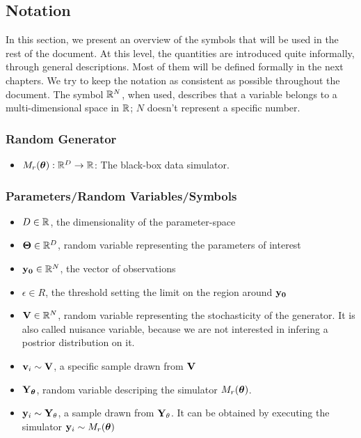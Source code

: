 \subsection{Notation}
\label{subsec:notation}

In this section, we present an overview of the symbols that will be
used in the rest of the document. At this level, the quantities are
introduced quite informally, through general descriptions. Most of
them will be defined formally in the next chapters. We try to keep the
notation as consistent as possible throughout the document. The symbol
$\mathbb{R}^N$, when used, describes that a variable belongs to a
multi-dimensional space in $\mathbb{R}$; $N$ doesn't represent a specific
number.

\subsubsection*{Random Generator}
\label{sec:random-generator}
\begin{itemize}
\item $M_r(\boldsymbol{\theta}): \mathbb{R}^D \rightarrow \mathbb{R}$: The black-box data simulator.
\end{itemize}

\subsubsection*{Parameters/Random Variables/Symbols}
\label{sec:variables}

\begin{itemize}
\item $D \in \mathbb{R}$, the dimensionality of the parameter-space
\item $\mathbf{\Theta} \in \mathbb{R}^D$, random variable representing the parameters of interest
\item $\mathbf{y_0} \in \mathbb{R}^N$, the vector of observations
\item $\epsilon \in R$, the threshold setting the limit on the region around $\mathbf{y_0}$
\item $\mathbf{V} \in \mathbb{R}^N$, random variable representing the stochasticity of
  the generator. It is also called nuisance variable, because we are not interested in infering a postrior distribution on it.
\item $\mathbf{v}_i \sim \mathbf{V}$, a specific sample drawn from $\mathbf{V}$
\item $\mathbf{Y}_{\boldsymbol{\theta}}$, random variable descriping the simulator $M_r(\boldsymbol{\theta})$. 
\item $\mathbf{y}_i \sim \mathbf{Y}_\theta$, a sample drawn from $\mathbf{Y}_\theta$. It can
  be obtained by executing the simulator $\mathbf{y}_i \sim M_r(\boldsymbol{\theta})$
\end{itemize}


